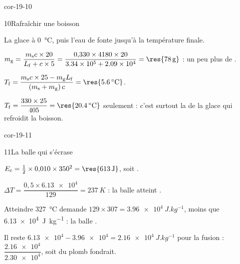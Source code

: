 \begin{blocLivre}{cor-19-10}
\begin{corrige}{10}{Rafraîchir une boisson}
\begin{questions}
\item La glace  à \qty{0}{\degreeCelsius}, puis l'eau de fonte  jusqu'à la température finale.
\item $m_\mathrm{g}=\dfrac{m_\mathrm{s}c\times20}{L_\mathrm{f}+c\times5}=\dfrac{0{,}330\times4180\times20}{\num{3.34e5}+\num{2.09e4}}=\res{\qty{78}{g}}$ : un peu plus de
.
\item $T_\mathrm{f}=\dfrac{m_\mathrm{s}c\times25-m_\mathrm{g}L_\mathrm{f}}{(m_\mathrm{s}+m_\mathrm{g})\,c}=\res{\qty{5,6}{\degreeCelsius}}$.
\item $T_\mathrm{f}=\dfrac{330\times25}{405}=\res{\qty{20,4}{\degreeCelsius}}$ seulement : c'est surtout la  de la glace
qui refroidit la boisson.
\end{questions}
\end{corrige}
\end{blocLivre}
\begin{blocLivre}{cor-19-11}
\begin{corrige}{11}{La balle qui s'écrase}
\begin{questions}
\item $E_\mathrm{c}=\frac12\times0{,}010\times350^2=\res{\qty{613}{J}}$, soit .
\item $\Delta T=\dfrac{0{,}5\times\num{6.13e4}}{129}=\qty{237}{K}$ : la balle atteint .
\item Atteindre \qty{327}{\degreeCelsius} demande $129\times307=\qty{3,96e4}{J.kg^{-1}}$, moins que \qty{6,13e4}{J.kg^{-1}} : la
balle .
\item Il reste $\num{6.13e4}-\num{3.96e4}=\qty{2,16e4}{J.kg^{-1}}$ pour la fusion : $\dfrac{\num{2.16e4}}{\num{2.30e4}}$, soit
 du plomb fondrait.
\end{questions}
\end{corrige}
\end{blocLivre}

